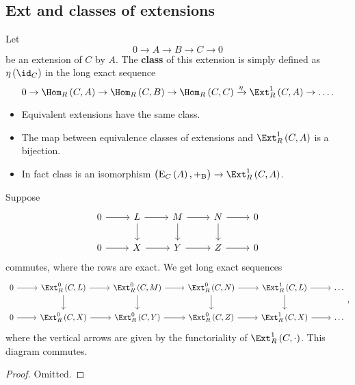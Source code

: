\subsection{Ext and classes of extensions}


\begin{definition}
Let
$$ 0 \to A \to B \to C \to 0 $$
be an extension of $ C $ by $ A $. The \textbf{class} of this extension is simply defined as $ \eta\br{\id_C} $ in the long exact sequence
$$ 0 \to \Hom_R\br{C, A} \to \Hom_R\br{C, B} \to \Hom_R\br{C, C} \xrightarrow{\eta} \Ext_R^1\br{C, A} \to \dots. $$
\end{definition}

\begin{proposition}
\label{prop:extensionclass}
\hfill
\begin{itemize}
\item Equivalent extensions have the same class.
\item The map between equivalence classes of extensions and $ \Ext_R^1\br{C, A} $ is a bijection.
\item In fact class is an isomorphism $ \br{\E_C\br{A}, +_\B} \to \Ext_R^1\br{C, A} $.
\end{itemize}
\end{proposition}

\begin{lemma}
\label{lem:extensionclass}
Suppose
$$
\begin{tikzcd}
0 \arrow{r} & L \arrow{r} \arrow{d} & M \arrow{r} \arrow{d} & N \arrow{r} \arrow{d} & 0 \\
0 \arrow{r} & X \arrow{r} & Y \arrow{r} & Z \arrow{r} & 0
\end{tikzcd}
$$
commutes, where the rows are exact. We get long exact sequences
$$
\begin{tikzcd}
0 \arrow{r} & \Ext_R^0\br{C, L} \arrow{r} \arrow{d} & \Ext_R^0\br{C, M} \arrow{r} \arrow{d} & \Ext_R^0\br{C, N} \arrow{r} \arrow{d} & \Ext_R^1\br{C, L} \arrow{r} \arrow{d} & \dots \\
0 \arrow{r} & \Ext_R^0\br{C, X} \arrow{r} & \Ext_R^0\br{C, Y} \arrow{r} & \Ext_R^0\br{C, Z} \arrow{r} & \Ext_R^1\br{C, X} \arrow{r} & \dots
\end{tikzcd},
$$
where the vertical arrows are given by the functoriality of $ \Ext_R^1\br{C, \cdot} $. This diagram commutes.
\end{lemma}

\begin{proof}
Omitted.
\end{proof}

